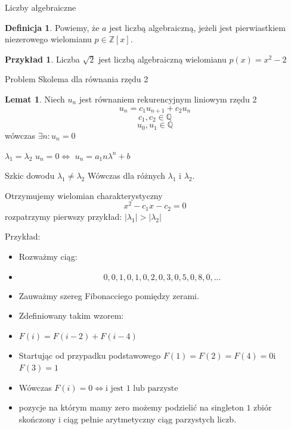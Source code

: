 \documentclass{beamer}
\theoremstyle{definition}
\newtheorem*{definicja}{Definicja}
\newtheorem*{lemma}{Lemat}
\newtheorem*{przyklad}{Przykład}
\begin{document}
\begin{frame}{Liczby algebraiczne}
\begin{definicja}
    Powiemy, że $a $ jest liczbą algebraiczną, jeżeli jest pierwiastkiem niezerowego wielomianu $p \in \mathbb{Z}[x]$. 
\end{definicja}

\begin{przyklad}
    Liczba $\sqrt{2}$ jest liczbą algebraiczną wielomianu $p(x) = x^{2} - 2$
\end{przyklad}

\end{frame}


\begin{frame}{Problem Skolema dla równania rzędu 2}


\begin{lemma}
    Niech $u_n$ jest równaniem rekurencyjnym liniowym rzędu 2
    $$
        u_n = c_1 u_{n+1} + c_2 u_n
    $$
    $$
        c_1, c_2 \in \mathbb{Q}
    $$
    $$
        u_0, u_1 \in \mathbb{Q}
    $$
    wówczas $\exists n : u_n = 0$
\end{lemma}

\end{frame}

\begin{frame}{$\lambda_1= \lambda_2$}
    $u_n = 0 \iff $ $u_n = a_{1} n \lambda^{n} + b$
    
\end{frame}

\begin{frame}{Szkic dowodu $\lambda_1 \neq \lambda_2$}
    Wówczas dla różnych $\lambda_1$ i $\lambda_2$. 
    
    Otrzymujemy wielomian charakterystyczny 
    $$
        x^{2} - c_1 x - c_2 = 0
    $$
    rozpatrzymy pierwszy przykład:
    $|\lambda_1| > |\lambda_2|$
\end{frame}

\begin{frame}{Przykład:}
\begin{itemize}
   \item  Rozważmy ciąg: 
   \item  $$ 0, 0, 1, 0, 1, 0, 2, 0, 3, 0, 5, 0, 8, 0, ...$$
    \item      Zauważmy szereg Fibonacciego pomiędzy zerami. 
    \item  Zdefiniowany takim wzorem:
    \item  $F(i) = F(i-2) + F(i-4)$
    \item  Startując od przypadku podstawowego $F(1) = F(2) = F(4) = 0$i $F(3) = 1$
    \item  Wówczas $F(i) = 0 \iff \text{i jest 1 lub parzyste} $  
    \item pozycje na którym mamy zero możemy podzielić na singleton ${1}$ zbiór skończony i ciąg pełnie arytmetyczny ciąg parzystych liczb. 
\end{itemize}
\end{frame}
\end{document}
